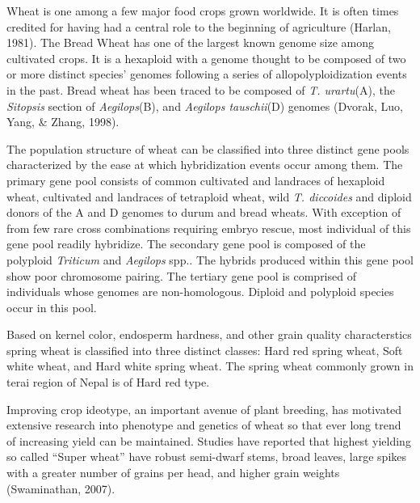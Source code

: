 \documentclass[12pt,oneside]{dukestatscithesis} %
\theoremstyle{definition}
\theoremstyle{definition}
\theoremstyle{definition}
\theoremstyle{remark}
\begin{document}
Wheat is one among a few major food crops grown worldwide. It is often
times credited for having had a central role to the beginning of
agriculture (Harlan, 1981). The Bread Wheat has one of the largest known
genome size among cultivated crops. It is a hexaploid with a genome
thought to be composed of two or more distinct species' genomes
following a series of allopolyploidization events in the past. Bread
wheat has been traced to be composed of \emph{T. urartu}(A), the
\emph{Sitopsis} section of \emph{Aegilops}(B), and \emph{Aegilops
tauschii}(D) genomes (Dvorak, Luo, Yang, \& Zhang, 1998).

The population structure of wheat can be classified into three distinct
gene pools characterized by the ease at which hybridization events occur
among them. The primary gene pool consists of common cultivated and
landraces of hexaploid wheat, cultivated and landraces of tetraploid
wheat, wild \emph{T. diccoides} and diploid donors of the A and D
genomes to durum and bread wheats. With exception of from few rare cross
combinations requiring embryo rescue, most individual of this gene pool
readily hybridize. The secondary gene pool is composed of the polyploid
\emph{Triticum} and \emph{Aegilops} spp.. The hybrids produced within
this gene pool show poor chromosome pairing. The tertiary gene pool is
comprised of individuals whose genomes are non-homologous. Diploid and
polyploid species occur in this pool.

Based on kernel color, endosperm hardness, and other grain quality
characterstics spring wheat is classified into three distinct classes:
Hard red spring wheat, Soft white wheat, and Hard white spring wheat.
The spring wheat commonly grown in terai region of Nepal is of Hard red
type.

Improving crop ideotype, an important avenue of plant breeding, has
motivated extensive research into phenotype and genetics of wheat so
that ever long trend of increasing yield can be maintained. Studies have
reported that highest yielding so called ``Super wheat'' have robust
semi-dwarf stems, broad leaves, large spikes with a greater number of
grains per head, and higher grain weights (Swaminathan, 2007).
\end{document}
